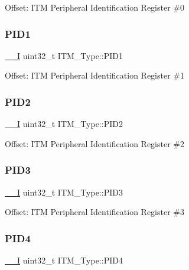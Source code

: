 Offset\+: I\+TM Peripheral Identification Register \#0 \mbox{\label{struct_i_t_m___type_a30e87ec6f93ecc9fe4f135ca8b068990}} 
\subsubsection{\texorpdfstring{PID1}{PID1}}
{\footnotesize\ttfamily \mbox{\hyperlink{group___c_m_s_i_s___c_m3__core__definitions_gaf63697ed9952cc71e1225efe205f6cd3}{\+\_\+\+\_\+I}} uint32\+\_\+t I\+T\+M\+\_\+\+Type\+::\+P\+I\+D1}

Offset\+: I\+TM Peripheral Identification Register \#1 \mbox{\label{struct_i_t_m___type_ae139d2e588bb382573ffcce3625a88cd}} 
\subsubsection{\texorpdfstring{PID2}{PID2}}
{\footnotesize\ttfamily \mbox{\hyperlink{group___c_m_s_i_s___c_m3__core__definitions_gaf63697ed9952cc71e1225efe205f6cd3}{\+\_\+\+\_\+I}} uint32\+\_\+t I\+T\+M\+\_\+\+Type\+::\+P\+I\+D2}

Offset\+: I\+TM Peripheral Identification Register \#2 \mbox{\label{struct_i_t_m___type_af006ee26c7e61c9a3712a80ac74a6cf3}} 
\subsubsection{\texorpdfstring{PID3}{PID3}}
{\footnotesize\ttfamily \mbox{\hyperlink{group___c_m_s_i_s___c_m3__core__definitions_gaf63697ed9952cc71e1225efe205f6cd3}{\+\_\+\+\_\+I}} uint32\+\_\+t I\+T\+M\+\_\+\+Type\+::\+P\+I\+D3}

Offset\+: I\+TM Peripheral Identification Register \#3 \mbox{\label{struct_i_t_m___type_accfc7de00b0eaba0301e8f4553f70512}} 
\subsubsection{\texorpdfstring{PID4}{PID4}}
{\footnotesize\ttfamily \mbox{\hyperlink{group___c_m_s_i_s___c_m3__core__definitions_gaf63697ed9952cc71e1225efe205f6cd3}{\+\_\+\+\_\+I}} uint32\+\_\+t I\+T\+M\+\_\+\+Type\+::\+P\+I\+D4}

